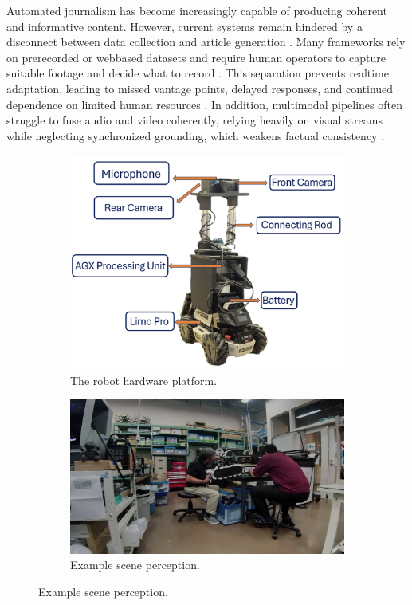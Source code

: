 \documentclass[letterpaper, 10 pt, conference]{ieeeconf}  %
\begin{document}
Automated journalism has become increasingly capable of producing coherent and informative content. However, current systems remain hindered by a disconnect between data collection and article generation \cite{graefe2016guide}. Many frameworks rely on pre\-recorded or web\-based datasets and require human operators to capture suitable footage and decide what to record \cite{diakopoulos2019automating,reuters_tracer2017}. This separation prevents real\-time adaptation, leading to missed vantage points, delayed responses, and continued dependence on limited human resources \cite{graefe2016guide}. In addition, multi\-modal pipelines often struggle to fuse audio and video coherently, relying heavily on visual streams while neglecting synchronized grounding, which weakens factual consistency \cite{mast2020,mhms2022}.


\begin{figure}[!t]
  \centering
  \begin{subfigure}{0.95\columnwidth}
    \centering
    \includegraphics[width=0.9\columnwidth]{figures/setup.png}
    \caption{The robot hardware platform.}
  \end{subfigure}
  
  \vspace{2pt}
  
  \begin{subfigure}{0.95\columnwidth}
    \centering
    \includegraphics[width=0.9\columnwidth]{figures/scene.jpg}
    \caption{Example scene perception.}
  \end{subfigure}
  

\end{figure}
\end{document}
